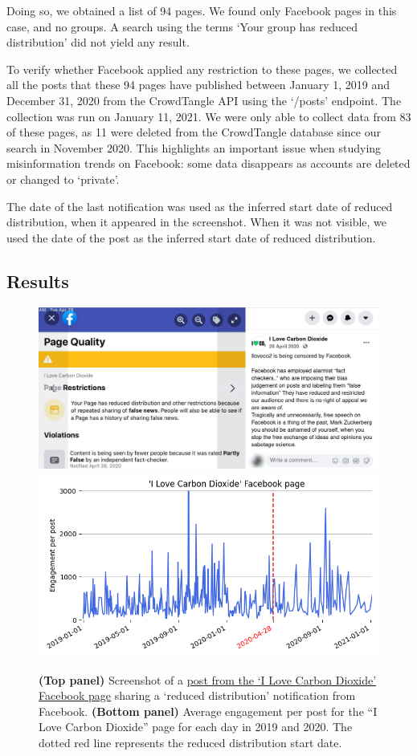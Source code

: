 \documentclass[review]{elsarticle}
\begin{document}
{Doing so, we obtained a list of 94 pages. 
We found only Facebook pages in this case, and no groups. 
A search using the terms `Your group has reduced distribution' did not yield any result.

To verify whether Facebook applied any restriction to these pages, we collected all the posts that these 94 pages have published between January 1, 2019 and December 31, 2020 from the CrowdTangle API using the `/posts' endpoint. 
The collection was run on January 11, 2021.
We were only able to collect data from 83 of these pages, as 11 were deleted from the CrowdTangle database since our search in November 2020. 
This highlights an important issue when studying misinformation trends on Facebook: some data disappears as accounts are deleted or changed to ‘private’.

The date of the last notification was used as the inferred start date of reduced distribution, when it appeared in the screenshot. 
When it was not visible, we used the date of the post as the inferred start date of reduced distribution. 

\subsection{Results}

\begin{figure}[!h]
\centering
\includegraphics[scale=0.12]{./../figure/reduce_example_screenshot.png}
\includegraphics[scale=0.5]{./../figure/reduce_example_timeseries.png}
\caption{
{\bf(Top panel)} Screenshot of a \href{https://archive.is/ie4dR}{post from the `I Love Carbon Dioxide' Facebook page} sharing a `reduced distribution' notification from Facebook. 
{\bf(Bottom panel)} Average engagement per post for the “I Love Carbon Dioxide” page for each day in 2019 and 2020.
The dotted red line represents the reduced distribution start date.
}
\label{reduce_example}
\end{figure}

}
\end{document}
